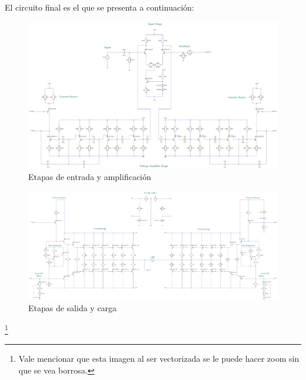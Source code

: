 


El circuito final es el que se presenta a continuación:
 \begin{figure}[H]
\centering
	\includegraphics[width=\textwidth]{ImagenesCaracteristicas/TEX1.pdf}
	\caption{Etapas de entrada y amplificación}
	\label{fig:circ}
\end{figure}
 \begin{figure}[H]
\centering
	\includegraphics[width=\textwidth]{ImagenesCaracteristicas/TEX2.pdf}
	\caption{Etapas de salida y carga}
	\label{fig:circ}
\end{figure}\footnote{Vale mencionar que esta imagen al ser vectorizada se le puede hacer zoom sin que se vea borrosa.}

